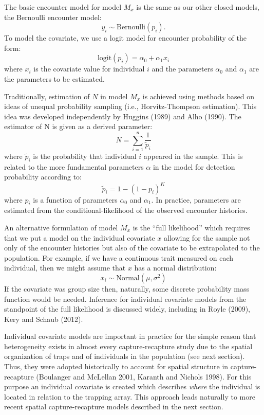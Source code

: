 \documentclass{book}
\begin{document}
The basic encounter model for model $M_x$ is the same as our other
closed models, the Bernoulli encounter model:
\[
y_{i} \sim \mbox{Bernoulli}(p_{i}).
\]
To model the covariate, we use a logit model for encounter probability
of the form:
\begin{equation}
 \mbox{logit}(p_{i}) = \alpha_0 + \alpha_1 x_{i}
\end{equation}
where $x_i$ is the covariate value for individual $i$ and the
parameters $\alpha_0$ and $\alpha_1$ are the parameters to be
estimated.

Traditionally, estimation of $N$ in model $M_{x}$ is achieved using
methods based on ideas of unequal probability sampling (i.e.,
Horvitz-Thompson estimation). This idea was developed independently by
Huggins (1989) and Alho (1990). The estimator of N is given as a
derived parameter:
\[
\hat{N} = \sum_{i=1}^{n} \frac{1}{\tilde{p}_{i}}
\]
where $\tilde{p}_{i}$ is the probability that individual $i$ appeared
in the sample.  This is related to the more fundamental parameters
$\alpha$ in the model for detection probability according to:
\[
\tilde{p}_{i}  = 1- (1-p_{i})^K
\]
where $p_{i}$ is a function of parameters $\alpha_{0}$ and
$\alpha_{1}$.  In practice, parameters are estimated from the
conditional-likelihood of the observed encounter histories.

An alternative formulation of model $M_x$ is the ``full likelihood''
which requires that we put a model on the individual covariate $x$
allowing for the sample not only of the encounter histories but also
of the covariate to be extrapolated to the population.  For example,
if we have a continuous trait measured on each individual, then we
might assume that $x$ has a normal distribution:
\[
x_{i} \sim \mbox{Normal}(\mu,\sigma^{2})
\]
If the covariate was group size then, naturally, some discrete
probability mass function would be needed. Inference for individual
covariate models from the standpoint of the  full likelihood is
discussed widely, including in Royle (2009), Kery and Schaub (2012).

Individual covariate models are important in practice for the simple
reason that heterogeneity exists in almost every capture-recapture
study due to the spatial organization of traps and of individuals in
the population (see next section). Thus, they were adopted historically
to account for spatial structure in capture-recapture (Boulanger and
McLellan 2001, Karanth and Nichols 1998).  For this purpose an
individual covariate is created which describes {\it where} the
individual is located in relation to the trapping array.  This
approach leads naturally to more recent spatial capture-recapture
models described in the next section.
\end{document}
